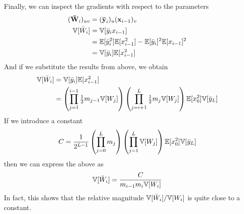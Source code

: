 Finally, we can inspect the gradients with respect to the parameters
\begin{align}
(\boldsymbol{\mathbf{\bar{W}}}_{i})_{u v} & = (\boldsymbol{\mathbf{\bar{y}}}_{i})_{u} (\boldsymbol{\mathbf{x}}_{i - 1})_{v} \\
\mathbb{V}[\bar{W}_{i}] & = \mathbb{V}[\bar{y}_{i} x_{i-1}] \\
& = \mathbb{E}[\bar{y}_{i}^2] \mathbb{E}[x_{i-1}^2] - \mathbb{E}[\bar{y}_{i}]^2 \mathbb{E}[x_{i-1}]^2 \\
& = \mathbb{V}[\bar{y}_{i}] \mathbb{E}[x_{i-1}^2]
\end{align}
And if we substitute the results from above, we obtain
\begin{align}
\mathbb{V}[\bar{W}_{i}] & = \mathbb{V}[\bar{y}_{i}] \mathbb{E}[x_{i-1}^2] \\
& = \left( \prod_{j = 1}^{i-1} \tfrac{1}{2} m_{j - 1} \mathbb{V}[W_{j}] \right)
  \left( \prod_{j = i+1}^{L} \tfrac{1}{2} m_{j} \mathbb{V}[W_{j}] \right)
  \mathbb{E}[x_{0}^2] \mathbb{V}[\bar{y}_{L}]
\end{align}
If we introduce a constant
\begin{equation}
C = \frac{1}{2^{L-1}} \left(\prod_{j=0}^{L} m_{j} \right) \left(\prod_{j=1}^{L} \mathbb{V}[W_{j}] \right)
  \mathbb{E}[x_{0}^2] \mathbb{V}[\bar{y}_{L}]
\end{equation}
then we can express the above as
\begin{equation}
\mathbb{V}[\bar{W}_{i}] = \frac{C}{m_{i-1} m_{i} \mathbb{V}[W_{i}]}
\end{equation}
In fact, this shows that the relative magnitude $\mathbb{V}[\bar{W}_{i}] / \mathbb{V}[W_{i}]$ is quite close to a constant.